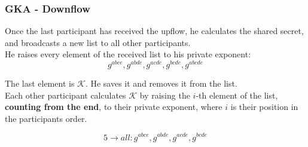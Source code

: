 \begin{frame}
  \frametitle{GKA - Downflow}
  Once the last participant has received the upflow, he calculates the shared secret, and broadcasts a new list to all other participants.\\[0.3cm]

  He raises every element of the  received list to his private exponent:
  \[ g^{abce}, g^{abde}, g^{acde}, g^{bcde}, g^{abcde} \]

  The last element is $\mathcal{K}$. He saves it and removes it from the list.\\[0.3cm]

  Each other participant calculates $\mathcal{K}$ by raising the $i$-th element of the list, {\bf counting from the end}, to their private exponent, where $i$ is their position in the participants order.

  \begin{minipage}{.47\textwidth}
    \[ 5 \rightarrow all: g^{abce}, g^{abde}, g^{acde}, g^{bcde} \]

  \end{minipage}
  \begin{minipage}{.47\textwidth}
  \begin{figure}
    \end{figure}
  \end{minipage}
\end{frame}
